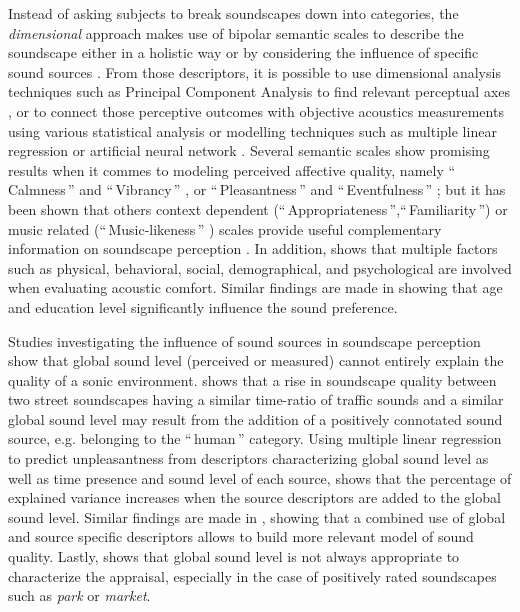 \documentclass[twoside,twocolumn]{article}
\begin{document}
Instead of asking subjects to break soundscapes down into categories, the \textit{dimensional} approach makes use of bipolar semantic scales to describe the soundscape either in a holistic way \cite{jeon2013soundwalk, kang_semantic_2010, cain_development_2013, torija2013application} or by considering the influence of specific sound sources \cite{guyot2005urban, lavandier2006contribution, ricciardi2015sound}. From those descriptors, it is possible to use dimensional analysis techniques such as Principal Component Analysis to find relevant perceptual axes \cite{cain_development_2013}, or to connect those perceptive outcomes with objective acoustics measurements using various statistical analysis or modelling techniques such as multiple linear regression \cite{lavandier2006contribution,ricciardi2015sound} or artificial neural network \cite{yu2009modeling}. Several semantic scales show promising results when it commes to modeling perceived affective quality, namely ``\,Calmness\,'' and ``\,Vibrancy\,'' \cite{cain_development_2013, axelsson2010principal}, or ``\,Pleasantness\,'' and ``\,Eventfulness\,'' \cite{axelsson2010principal}; but it has been shown that others context dependent (``\,Appropriateness\,'',``\,Familiarity\,'') or music related (``\,Music-likeness\,'' ) scales provide useful complementary information on soundscape perception \cite{aletta2016soundscape}. In addition, \cite{yu2009modeling} shows that multiple factors such as physical, behavioral, social, demographical, and psychological are involved when evaluating acoustic comfort.  Similar findings are made in \cite{yu2010factors} showing that age and education level significantly influence the sound preference.
 
Studies investigating the influence of sound sources in soundscape perception show that global sound level (perceived or measured) cannot entirely explain the quality of a sonic environment. \cite{guyot2005urban} shows that a rise in soundscape quality between two street soundscapes having a similar time-ratio of traffic sounds and a similar global sound level may result from the addition of a positively connotated sound source, e.g. belonging to the ``\,human\,'' category. Using multiple linear regression to predict unpleasantness from descriptors characterizing global sound level as well as time presence and sound level of each source, \cite{lavandier2006contribution} shows that the percentage of explained variance increases when the source descriptors are added to the global sound level. Similar findings are made in \cite{ricciardi2015sound}, showing that a combined use of global and source specific descriptors allows to build more relevant model of sound quality. Lastly, \cite{lavandier2006contribution} shows that global sound level is not always appropriate to characterize the appraisal, especially in the case of positively rated soundscapes such as \textit{park} or \textit{market}. 
\end{document}
